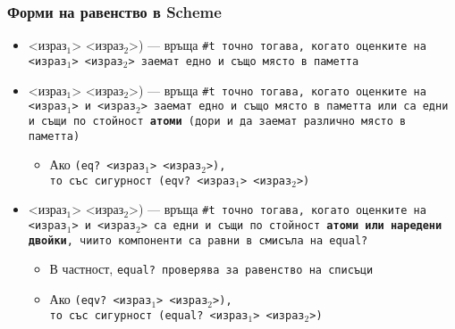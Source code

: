 \documentclass[alsotrans]{beamerswitch}
\begin{document}
\begin{frame}
  \frametitle{Форми на равенство в Scheme}

  \begin{itemize}[<+->]
  \item {} <израз$_1$> <израз$_2$>\tta) --- връща \tt{\#t} точно тогава, когато оценките на <израз$_1$> <израз$_2$> заемат едно и също място в паметта
  \item {} <израз$_1$> <израз$_2$>\tta) --- връща \tt{\#t} точно тогава, когато оценките на <израз$_1$> и <израз$_2$> заемат едно и също място в паметта или са едни и същи по стойност \textbf{атоми} (дори и да заемат различно място в паметта)
    \begin{itemize}
    \item Ако \tt{(eq?} <израз$_1$> <израз$_2$>\tt),\\
      то със сигурност \tt{(eqv?} <израз$_1$> <израз$_2$>\tt)
    \end{itemize}
  \item {} <израз$_1$> <израз$_2$>\tta) --- връща \tt{\#t} точно тогава, когато оценките на <израз$_1$> и <израз$_2$> са едни и същи по стойност \textbf{атоми или наредени двойки}, чиито компоненти са равни в смисъла на \tt{equal?}
    \begin{itemize}
    \item В частност, \tt{equal?} проверява за равенство на списъци
    \item Ако \tt{(eqv?} <израз$_1$> <израз$_2$>\tt),\\
      то със сигурност \tt{(equal?} <израз$_1$> <израз$_2$>\tt)
    \end{itemize}
  \end{itemize}
\end{frame}
\end{document}
